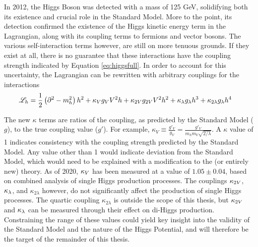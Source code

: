     In 2012, the Higgs Boson was detected with a mass of 125 GeV, solidifying both its existence and crucial role in the Standard Model.
    More to the point, its detection confirmed the existence of the Higgs kinetic energy term in the Lagrangian,
        along with its coupling terms to fermions and vector bosons.
    The various self-interaction terms however, are still on more tenuous grounds.
    If they exist at all, there is no guarantee that these interactions have the coupling strength indicated by Equation \ref{eq:higgsfull}.
    In order to account for this uncertainty, the Lagrangian can be rewritten with arbitrary couplings for the interactions
    \begin{equation} \begin{split} \label{eq:higgskappas}
        \mathscr{L}_h &= \frac{1}{2} \left(\partial^2 - m_h^2 \right) h^2
            + \kappa_{V} g_V V^2 h + \kappa_{2V} g_{2V} V^2 h^2
            + \kappa_{\lambda} g_{\lambda} h^3 + \kappa_{2 \lambda} g_{\lambda} h^4
    \end{split} \end{equation}

    The new $\kappa$ terms are ratios of the coupling, as predicted by the Standard Model ($g$), to the true coupling value ($g'$).
    For example, $\kappa_V \equiv \frac{g'_V}{g_V} = \frac{g'_V}{m_h m_V \sqrt{2/\lambda}}$.
    A $\kappa$ value of 1 indicates consistency with the coupling strength predicted by the Standard Model.
    Any value other than 1 would indicate deviation from the Standard Model,
        which would need to be explained with a modification to the (or entirely new) theory.
    As of 2020, $\kappa_{V}$ has been measured at a value of $1.05 \pm 0.04$,
        based on combined analysis of single Higgs production processes\cite{paper:higgs_combined}.
    The couplings $\kappa_{2V}$, $\kappa_{\lambda}$, and $\kappa_{2\lambda}$ however, do not significantly affect the production of single Higgs processes.
    The quartic coupling $\kappa_{2\lambda}$ is outside the scope of this thesis,
        but $\kappa_{2V}$ and $\kappa_{\lambda}$ can be measured through their effect on di-Higgs production.
    Constraining the range of these values could yield key insight into the validity of the Standard Model and the nature of the Higgs Potential,
        and will therefore be the target of the remainder of this thesis.
